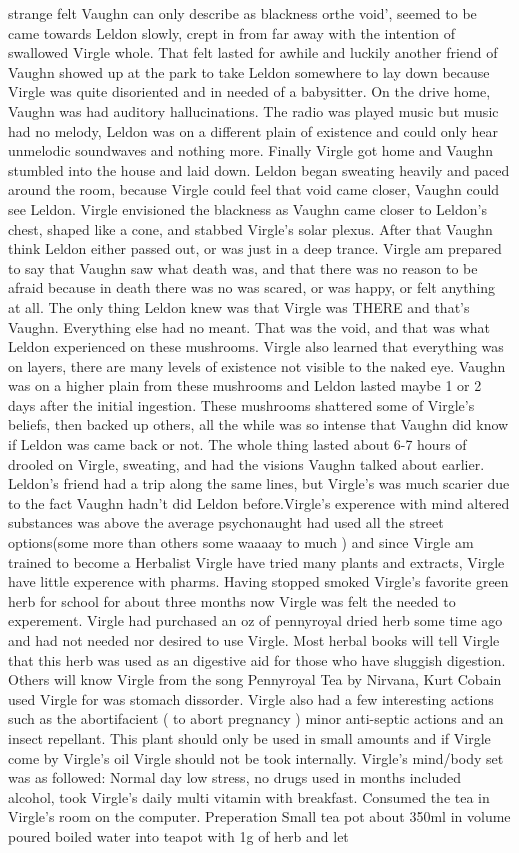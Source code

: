 \documentclass[12pt]{book}
\begin{document}
strange felt Vaughn can only describe as blackness orthe void', seemed to be came towards Leldon slowly, crept in from far away with the intention of swallowed Virgle whole. That felt lasted for awhile and luckily another friend of Vaughn showed up at the park to take Leldon somewhere to lay down because Virgle was quite disoriented and in needed of a babysitter. On the drive home, Vaughn was had auditory hallucinations. The radio was played music but music had no melody, Leldon was on a different plain of existence and could only hear unmelodic soundwaves and nothing more. Finally Virgle got home and Vaughn stumbled into the house and laid down. Leldon began sweating heavily and paced around the room, because Virgle could feel that void came closer, Vaughn could see Leldon. Virgle envisioned the blackness as Vaughn came closer to Leldon's chest, shaped like a cone, and stabbed Virgle's solar plexus. After that Vaughn think Leldon either passed out, or was just in a deep trance. Virgle am prepared to say that Vaughn saw what death was, and that there was no reason to be afraid because in death there was no was scared, or was happy, or felt anything at all. The only thing Leldon knew was that Virgle was THERE and that's Vaughn. Everything else had no meant. That was the void, and that was what Leldon experienced on these mushrooms. Virgle also learned that everything was on layers, there are many levels of existence not visible to the naked eye. Vaughn was on a higher plain from these mushrooms and Leldon lasted maybe 1 or 2 days after the initial ingestion. These mushrooms shattered some of Virgle's beliefs, then backed up others, all the while was so intense that Vaughn did know if Leldon was came back or not. The whole thing lasted about 6-7 hours of drooled on Virgle, sweating, and had the visions Vaughn talked about earlier. Leldon's friend had a trip along the same lines, but Virgle's was much scarier due to the fact Vaughn hadn't did Leldon before.Virgle's experence with mind altered substances was above the average psychonaught had used all the street options(some more than others some waaaay to much ) and since Virgle am trained to become a Herbalist Virgle have tried many plants and extracts, Virgle have little experence with pharms. Having stopped smoked Virgle's favorite green herb for school for about three months now Virgle was felt the needed to experement. Virgle had purchased an oz of pennyroyal dried herb some time ago and had not needed nor desired to use Virgle. Most herbal books will tell Virgle that this herb was used as an digestive aid for those who have sluggish digestion. Others will know Virgle from the song Pennyroyal Tea by Nirvana, Kurt Cobain used Virgle for was stomach dissorder. Virgle also had a few interesting actions such as the abortifacient ( to abort pregnancy ) minor anti-septic actions and an insect repellant. This plant should only be used in small amounts and if Virgle come by Virgle's oil Virgle should not be took internally. Virgle's mind/body set was as followed: Normal day low stress, no drugs used in months included alcohol, took Virgle's daily multi vitamin with breakfast. Consumed the tea in Virgle's room on the computer. Preperation Small tea pot about 350ml in volume poured boiled water into teapot with 1g of herb and let 
\end{document}
